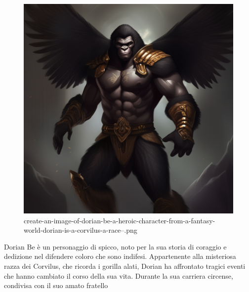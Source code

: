 \begin{figure}
\centering
\includegraphics{create-an-image-of-dorian-be-a-heroic-character-from-a-fantasy-world-dorian-is-a-corvilus-a-race--.png}
\caption{create-an-image-of-dorian-be-a-heroic-character-from-a-fantasy-world-dorian-is-a-corvilus-a-race--.png}
\end{figure}

Dorian Be è un personaggio di spicco, noto per la sua storia di coraggio
e dedizione nel difendere coloro che sono indifesi. Appartenente alla
misteriosa razza dei Corvilus, che ricorda i gorilla alati, Dorian ha
affrontato tragici eventi che hanno cambiato il corso della sua vita.
Durante la sua carriera circense, condivisa con il suo amato fratello
